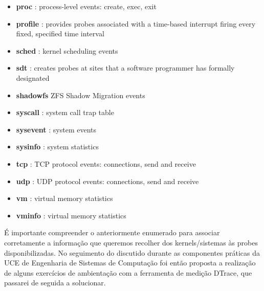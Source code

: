 \documentclass[a4paper]{article}
\begin{document}
{\begin{itemize}
      \item \textbf{proc} : process-level events: create, exec, exit
      \item \textbf{profile} : provides probes associated with a time-based interrupt firing every fixed, specified time interval
      \item \textbf{sched} : kernel scheduling events
      \item \textbf{sdt} : creates probes at sites that a software programmer has formally designated
      \item \textbf{shadowfs} ZFS Shadow Migration events
      \item \textbf{syscall} : system call trap table
      \item \textbf{sysevent} : system events
      \item \textbf{sysinfo} : system statistics
      \item \textbf{tcp} : TCP protocol events: connections, send and receive
      \item \textbf{udp} : UDP protocol events: connections, send and receive
      \item \textbf{vm} : virtual memory statistics
      \item \textbf{vminfo} : virtual memory statistics
      \end{itemize}


    É importante compreender o anteriormente enumerado para associar corretamente a informação que queremos recolher dos kernels/sistemas às probes disponibilizadas. No seguimento do discutido durante as componentes práticas da UCE de Engenharia de Sistemas de Computação foi então proposta a realização de alguns exercícios de ambientação com a ferramenta de medição DTrace, que passarei de seguida a solucionar. 
  }

\newpage
\section{}
\end{document}
